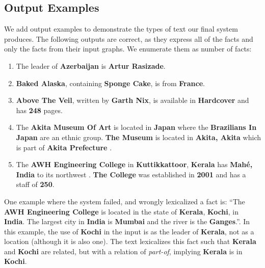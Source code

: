 \subsection{Output Examples}
We add output examples to demonstrate the types of text our final system produces. The following outputs are correct, as they express all of the facts and only the facts from their input graphs. We enumerate them as number of facts:
\begin{enumerate}
    \item The leader of \textbf{Azerbaijan} is \textbf{Artur Rasizade}.
    \item \textbf{Baked Alaska}, containing \textbf{Sponge Cake}, is from \textbf{France}.
    \item \textbf{Above The Veil}, written by \textbf{Garth Nix}, is available in \textbf{Hardcover} and has \textbf{248} pages.
    \item The \textbf{Akita Museum Of Art} is located in \textbf{Japan} where the \textbf{Brazilians In Japan} are an ethnic group. \textbf{The Museum} is located in \textbf{Akita, Akita} which is part of \textbf{Akita Prefecture} .
    \item The \textbf{AWH Engineering College} in \textbf{Kuttikkattoor}, \textbf{Kerala} has \textbf{Mahé, India} to its northwest . \textbf{The College} was established in \textbf{2001} and has a staff of \textbf{250}.
\end{enumerate}

One example where the system failed, and wrongly lexicalized a fact is: ``The \textbf{AWH Engineering College} is located in the state of \textbf{Kerala}, \textbf{Kochi}, in \textbf{India}. The largest city in \textbf{India} is \textbf{Mumbai} and the river is the \textbf{Ganges}.''. In this example, the use of \textbf{Kochi} in the input is as the leader of \textbf{Kerala}, not as a location (although it is also one). The text lexicalizes this fact such that \textbf{Kerala} and \textbf{Kochi} are related, but with a relation of \emph{part-of}, implying \textbf{Kerala} is in \textbf{Kochi}.
